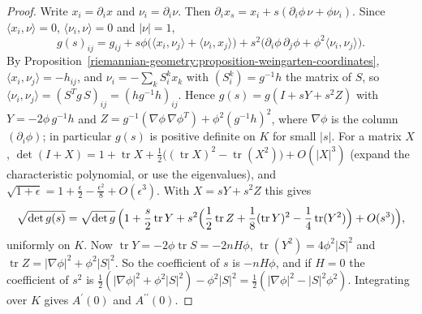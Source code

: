 \begin{proof}
Write $x_i = \partial_ix$ and $\nu_i = \partial_i\nu$. Then $\partial_ix_s = x_i + s(\partial_i\phi\,\nu + \phi\nu_i)$. Since $\langle x_i, \nu\rangle = 0$, $\langle\nu_i, \nu\rangle = 0$
and $|\nu| = 1$,
\[
g(s)_{ij} = g_{ij} + s\phi\bigl(\langle x_i, \nu_j\rangle + \langle\nu_i, x_j\rangle\bigr) + s^2\bigl(\partial_i\phi\,\partial_j\phi + \phi^2\langle\nu_i, \nu_j\rangle\bigr).
\]
By Proposition~\ref{riemannian-geometry:proposition-weingarten-coordinates}, $\langle x_i, \nu_j\rangle = -h_{ij}$, and $\nu_i = -\sum_kS^k_ix_k$ with $(S^k_i) = g^{-1}h$ the
matrix of $S$, so $\langle\nu_i, \nu_j\rangle = (S^Tg\,S)_{ij} = (hg^{-1}h)_{ij}$. Hence $g(s) = g(I + sY + s^2Z)$ with $Y = -2\phi\,g^{-1}h$ and
$Z = g^{-1}(\nabla\phi\,\nabla\phi^T) + \phi^2(g^{-1}h)^2$, where $\nabla\phi$ is the column $(\partial_i\phi)$; in particular $g(s)$ is positive definite on $K$ for small $|s|$. For a
matrix $X$, $\det(I + X) = 1 + \operatorname{tr}X + \frac12\bigl((\operatorname{tr}X)^2 - \operatorname{tr}(X^2)\bigr) + O(|X|^3)$ (expand the characteristic polynomial, or use
the eigenvalues), and $\sqrt{1 + \epsilon} = 1 + \frac\epsilon2 - \frac{\epsilon^2}8 + O(\epsilon^3)$. With $X = sY + s^2Z$ this gives
\[
\sqrt{\det g(s)} = \sqrt{\det g}\,\Bigl(1 + \frac s2\operatorname{tr}Y + s^2\Bigl(\frac12\operatorname{tr}Z + \frac18(\operatorname{tr}Y)^2 - \frac14\operatorname{tr}(Y^2)\Bigr) + O(s^3)\Bigr),
\]
uniformly on $K$. Now $\operatorname{tr}Y = -2\phi\operatorname{tr}S = -2nH\phi$, $\operatorname{tr}(Y^2) = 4\phi^2|S|^2$ and $\operatorname{tr}Z = |\nabla\phi|^2 + \phi^2|S|^2$. So the
coefficient of $s$ is $-nH\phi$, and if $H = 0$ the coefficient of $s^2$ is $\frac12(|\nabla\phi|^2 + \phi^2|S|^2) - \phi^2|S|^2 = \frac12(|\nabla\phi|^2 - |S|^2\phi^2)$. Integrating
over $K$ gives $A^{\prime}(0)$ and $A^{\prime\prime}(0)$.
\end{proof}


